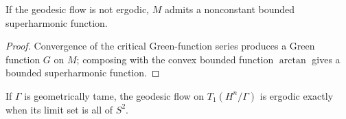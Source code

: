 \begin{corollary}
\label{thurston-ch09-superharmonic-function}
 If the geodesic flow is not ergodic, $M$ admits a nonconstant bounded superharmonic function.
\end{corollary}
\begin{proof}\sketch Convergence of the critical Green-function series produces a Green function $G$ on $M$; composing with the convex bounded function $\arctan$ gives a bounded superharmonic function.\end{proof}

\begin{corollary}
\label{thurston-ch09-tame-ergodicity-limit-set}
 If $\Gamma$ is geometrically tame, the geodesic flow on $T_1(H^n/\Gamma)$ is ergodic exactly when its limit set is all of $S^2$.
\end{corollary}
